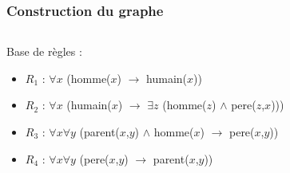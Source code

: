 \begin{frame}
	\frametitle{Construction du graphe}
	\begin{columns}
	\begin{column}{0.55\linewidth}
		Base de règles :
		\begin{itemize}
			\item $R_1$ : $\forall x$ (homme($x$) $\rightarrow$ humain($x$))
			\item $R_2$ : $\forall x$ (humain($x$) $\rightarrow$ $\exists z$ (homme($z$)
			$\wedge$ pere($z$,$x$)))
			\item $R_3$ : $\forall x \forall y$ (parent($x$,$y$) $\wedge$ homme($x$)
			$\rightarrow$ pere($x$,$y$))
			\item $R_4$ : $\forall x \forall y$ (pere($x$,$y$) $\rightarrow$
			parent($x$,$y$))
		\end{itemize}
	\end{column}
	\vline
	\hfill
	\begin{column}{0.35\linewidth}
		\begin{figure}
		\end{figure}
	\end{column}

	\end{columns}
\end{frame}

